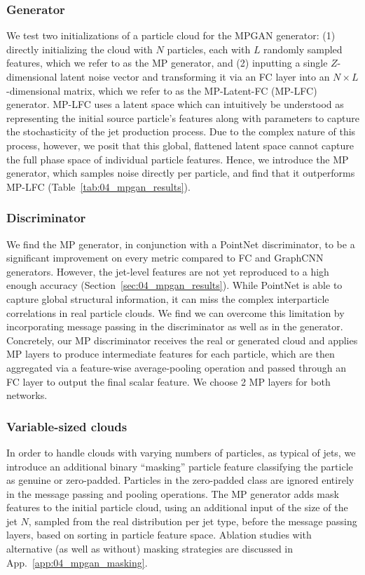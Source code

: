 \subsubsection{Generator}

We test two initializations of a particle cloud for the MPGAN generator: (1) directly initializing the cloud with $N$ particles, each with $L$ randomly sampled features, which we refer to as the MP generator, and (2) inputting a single $Z$-dimensional latent noise vector and transforming it via an FC layer into an $N\times L$-dimensional matrix, which we refer to as the MP-Latent-FC (MP-LFC) generator.
MP-LFC uses a latent space which can intuitively be understood as representing the initial source particle's features along with parameters to capture the stochasticity of the jet production process.
Due to the complex nature of this process, however, we posit that this global, flattened latent space cannot capture the full phase space of individual particle features.
Hence, we introduce the MP generator, which samples noise directly per particle, and find that it outperforms MP-LFC (Table~\ref{tab:04_mpgan_results}).

\subsubsection{Discriminator}

We find the MP generator, in conjunction with a PointNet discriminator, to be a significant improvement on every metric compared to FC and GraphCNN generators.
However, the jet-level features are not yet reproduced to a high enough accuracy (Section~\ref{sec:04_mpgan_results}).
While PointNet is able to capture global structural information, it can miss the complex interparticle correlations in real particle clouds.
We find we can overcome this limitation by incorporating message passing in the discriminator as well as in the generator.
Concretely, our MP discriminator receives the real or generated cloud and applies MP layers to produce intermediate features for each particle, which are then aggregated via a feature-wise average-pooling operation and passed through an FC layer to output the final scalar feature.
We choose 2 MP layers for both networks.

\subsubsection{Variable-sized clouds}

In order to handle clouds with varying numbers of particles, as typical of jets, we introduce an additional binary ``masking'' particle feature classifying the particle as genuine or zero-padded.
Particles in the zero-padded class are ignored entirely in the message passing and pooling operations.
The MP generator adds mask features to the initial particle cloud, using an additional input of the size of the jet $N$, sampled from the real distribution per jet type, before the message passing layers, based on sorting in particle feature space.
Ablation studies with alternative (as well as without) masking strategies are discussed in App.~\ref{app:04_mpgan_masking}.

